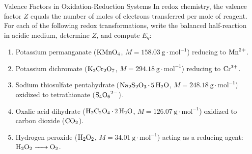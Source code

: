 \begin{exercise}{Valence Factors in Oxidation-Reduction Systems}
In redox chemistry, the valence factor $Z$ equals the number of moles of electrons transferred per mole of reagent. For each of the following redox transformations, write the balanced half-reaction in acidic medium, determine $Z$, and compute $E_q$:
\begin{enumerate}[leftmargin=1.5em,itemsep=2pt]
  \item Potassium permanganate ($\ce{KMnO4}$, $M = 158.03\ \mathrm{g\cdot mol^{-1}}$) reducing to $\ce{Mn^{2+}}$.
  \item Potassium dichromate ($\ce{K2Cr2O7}$, $M = 294.18\ \mathrm{g\cdot mol^{-1}}$) reducing to $\ce{Cr^{3+}}$.
  \item Sodium thiosulfate pentahydrate ($\ce{Na2S2O3*5H2O}$, $M = 248.18\ \mathrm{g\cdot mol^{-1}}$) oxidized to tetrathionate ($\ce{S4O6^{2-}}$).
  \item Oxalic acid dihydrate ($\ce{H2C2O4*2H2O}$, $M = 126.07\ \mathrm{g\cdot mol^{-1}}$) oxidized to carbon dioxide ($\ce{CO2}$).
  \item Hydrogen peroxide ($\ce{H2O2}$, $M = 34.01\ \mathrm{g\cdot mol^{-1}}$) acting as a reducing agent: $\ce{H2O2 -> O2}$.
\end{enumerate}
\end{exercise}

\begin{tabletworkspace}[5.0cm]
\end{tabletworkspace}

